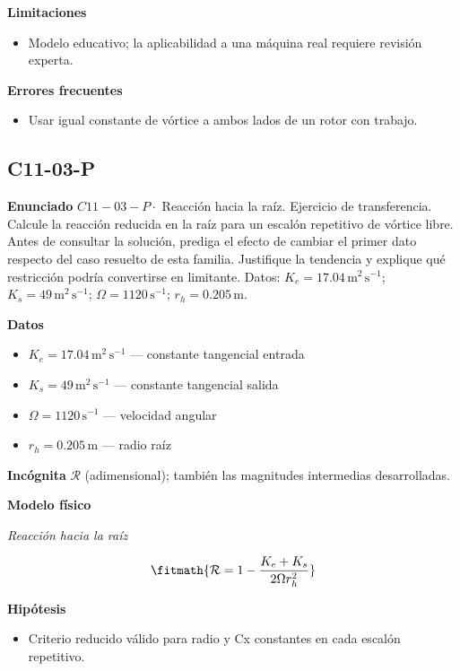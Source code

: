 \documentclass[10pt,openany]{book}
\begin{document}
\noindent\textbf{Limitaciones}
\begin{itemize}
\item Modelo educativo; la aplicabilidad a una máquina real requiere revisión experta.
\end{itemize}

\noindent\textbf{Errores frecuentes}
\begin{itemize}
\item Usar igual constante de vórtice a ambos lados de un rotor con trabajo.
\end{itemize}
\subsection*{C11-03-P}

\noindent\textbf{Enunciado}
\(C11-03-P \cdot\) Reacción hacia la raíz. Ejercicio de transferencia. Calcule la reacción reducida en la raíz para un escalón repetitivo de vórtice libre. Antes de consultar la solución, prediga el efecto de cambiar el primer dato respecto del caso resuelto de esta familia. Justifique la tendencia y explique qué restricción podría convertirse en limitante. Datos: \(K_e=17.04\, \mathrm{m}^{2}\,\mathrm{s}^{-1}\); \(K_s=49\, \mathrm{m}^{2}\,\mathrm{s}^{-1}\); \(\Omega=1120\, \mathrm{s}^{-1}\); \(r_h=0.205\, \mathrm{m}\).

\noindent\textbf{Datos}
\begin{itemize}
\item $K_e = 17.04\,\mathrm{m}^{2}\,\mathrm{s}^{-1}$ — constante tangencial entrada
\item $K_s = 49\,\mathrm{m}^{2}\,\mathrm{s}^{-1}$ — constante tangencial salida
\item $\Omega = 1120\,\mathrm{s}^{-1}$ — velocidad angular
\item $r_h = 0.205\,\mathrm{m}$ — radio raíz
\end{itemize}

\noindent\textbf{Incógnita}
$\mathcal{R}$ (adimensional); también las magnitudes intermedias desarrolladas.

\noindent\textbf{Modelo físico}

\noindent\textit{Reacción hacia la raíz}

\[
\fitmath{\mathcal R=1 - \frac{K_e + K_s}{2 \Omega r_h^{2}}}
\]

\noindent\textbf{Hipótesis}
\begin{itemize}
\item Criterio reducido válido para radio y Cx constantes en cada escalón repetitivo.
\end{itemize}
\end{document}
